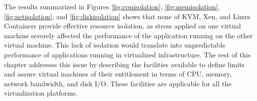 The results summarized in Figures \ref{fig:cpuisolation}, \ref{fig:memisolation}, \ref{fig:netisolation}, and \ref{fig:diskisolation} shows that none of KVM, Xen, and Linux Containers provide effective resource isolation, as stress applied on one virtual machine severely affected the performance of the application running on the other virtual machine. This lack of isolation would translate into unpredictable performance of applications running in virtualized infrastructure. The rest of this chapter addresses this issue by describing the facilities available to define limits and assure virtual machines of their entitlement in terms of CPU, memory, network bandwidth, and disk I/O. These facilities are applicable for all the virtualization platforms.








